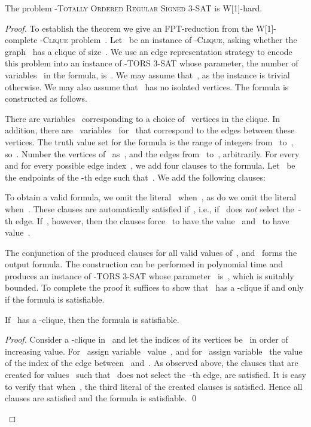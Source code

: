 \let\accentvec\vec  \documentclass{llncs}
\newcommand{\claimqed}{\renewcommand{\squareforqed}{}\qed\renewcommand{\squareforqed}{\plainsquareforqed}}
\newcommand{\SignedThreeSatn}{\textsc{-Totally Ordered Regular Signed 3-SAT}\xspace}
\newcommand{\nTORSThreeSat}{\textsc{-TORS 3-SAT}\xspace}
\newcommand{\kClique}{\textsc{-Clique}\xspace}
\begin{document}
\begin{theorem} \label{thm:threesat:whard}
The problem \SignedThreeSatn is W[1]-hard.
\end{theorem}
\begin{proof}
To establish the theorem we give an FPT-reduction from the W[1]-complete \kClique problem~\cite[Chapter 21]{DowneyF13}. Let~ be an instance of \kClique, asking whether the graph~ has a clique of size~. We use an edge representation strategy to encode this problem into an instance of \nTORSThreeSat whose parameter, the number of variables~ in the formula, is~. We may assume that~, as the instance is trivial otherwise. We may also assume that~ has no isolated vertices. The formula is constructed as follows.

There are variables~ corresponding to a choice of~ vertices in the clique. In addition, there are~ variables~ for~ that correspond to the edges between these vertices. The truth value set for the formula is the range of integers from~ to~, so~. Number the vertices of~ as~, and the edges from~ to~, arbitrarily. For every~ and for every possible edge index~, we add four clauses to the formula. Let~ be the endpoints of the -th edge such that~. We add the following clauses:
	
	
	To obtain a valid formula, we omit the literal~ when~, as do we omit the literal~ when~. These clauses are automatically satisfied if~, i.e., if~ does \emph{not} select the~-th edge. If~, however, then the clauses force~ to have the value~ and~ to have value~.
	
The conjunction of the produced clauses for all valid values of~, and~ forms the output formula. The construction can be performed in polynomial time and produces an instance of \nTORSThreeSat whose parameter~ is~, which is suitably bounded. To complete the proof it suffices to show that~ has a -clique if and only if the formula is satisfiable.

\begin{claim}
If~ has a -clique, then the formula is satisfiable.
\end{claim}
\begin{proof}
Consider a -clique in~ and let the indices of its vertices be~ in order of increasing value. For~ assign variable~ value~, and for~ assign variable~ the value of the index of the edge between~ and~. As observed above, the clauses that are created for values~ such that~ does not select the~-th edge, are satisfied. It is easy to verify that when~, the third literal of the created clauses is satisfied. Hence all clauses are satisfied and the formula is satisfiable.
\claimqed
\end{proof}


\end{proof}
\end{document}
